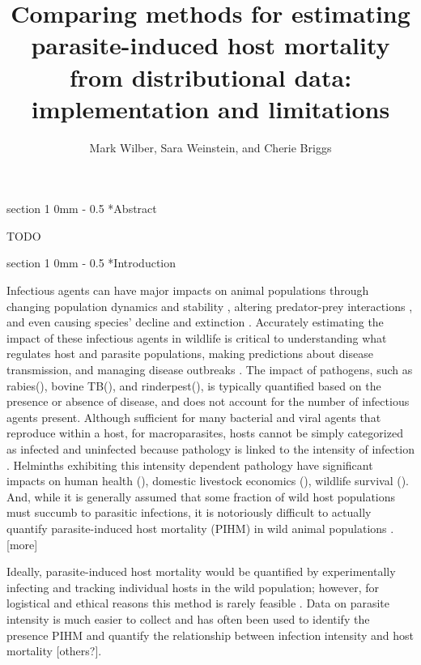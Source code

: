 \documentclass[12pt, a4paper]{article}
\title{Comparing methods for estimating parasite-induced host mortality from distributional data: implementation and limitations}
\author{Mark Wilber, Sara Weinstein, and Cherie Briggs}
\makeatletter
\renewcommand{\section}{\@startsection
{section}%
{1}%
{0mm}%
{-\baselineskip}%
{0.5\baselineskip}%
{\normalfont\bf\large}} %
\makeatother
\begin{document}
\maketitle

\section*{Abstract}

TODO

\doublespacing

\linenumbers
\section*{Introduction}

Infectious agents can have major impacts on animal populations through changing
population dynamics and stability \citep{Dobson1992}, altering predator-prey interactions \citep{Joly2004}, and
even causing species' decline and extinction \citep{DeCastro2005a,McCallum2012b}. Accurately estimating the impact
of these infectious agents in wildlife is critical to understanding what
regulates host and parasite populations, making predictions about disease
transmission, and managing disease outbreaks \citep{Langwig2015}. The impact of pathogens, such as rabies(), bovine TB(), and
rinderpest(),  is typically quantified based on the presence or absence of
disease, and does not account for the number of infectious agents present.
Although sufficient for many bacterial and viral agents that reproduce within a
host, for macroparasites, hosts cannot be simply categorized as infected and
uninfected because pathology is linked to the intensity of infection \citep{AndersonandMay1979}.  Helminths exhibiting this intensity dependent pathology have
significant impacts on human health (), domestic livestock economics (),
wildlife survival ().  And, while it is generally assumed that some fraction of
wild host populations must succumb to parasitic infections, it is notoriously
difficult to actually quantify parasite-induced host mortality (PIHM) in wild
animal populations \citep{Lafferty2002, McCallum2000a}. [more]

Ideally, parasite-induced host mortality would be
quantified by experimentally infecting and tracking individual hosts in the
wild population; however, for logistical and ethical reasons this method is
rarely feasible \citep{McCallum2000a}. Data on parasite intensity is much easier to collect and has
often been used to identify the presence PIHM \citep{Crofton1971a,Lester1977,Lester1984,Lanciani1989,Royce1990,Ferguson2011} and quantify the
relationship between infection intensity and host mortality \citep{Adjei1986} [others?].
\end{document}
